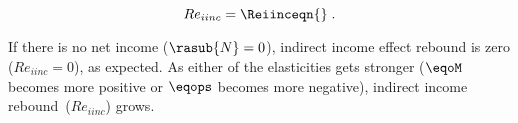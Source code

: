 \begin{equation}
  Re_{iinc} = \Reiinceqn{} \; .
\end{equation}

If there is no net income ($\rasub{N} = 0$), 
indirect income effect rebound is zero ($Re_{iinc} = 0$), as expected.
As either of the elasticities gets stronger 
($\eqoM$ becomes more positive or $\eqops$ becomes more negative), 
indirect income rebound~($Re_{iinc}$) grows.

% 
% 
% 
% 
% 
% 
% 


